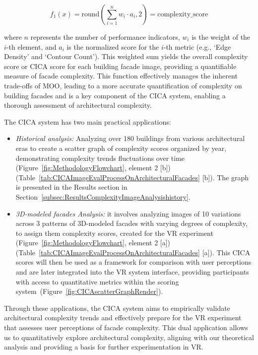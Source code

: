 \begin{equation}
    f_1(x) = \mathrm{round}\left(\sum_{i=1}^{n} w_i \cdot a_i, 2\right) = \text{complexity\_score}
    \label{eq:F1_ComplexityScoreFunction1}
\end{equation}

where \(n\) represents the number of performance indicators, \(w_i\) is the weight of the \(i\)-th element, and \(a_i\) is the normalized score for the \(i\)-th metric (e.g., `Edge Density' and `Contour Count').
This weighted sum yields the overall complexity score or CICA score for each building facade image, providing a quantifiable measure of facade complexity.
This function effectively manages the inherent trade-offs of MOO, leading to a more accurate quantification of complexity on building facades and is a key component of the CICA system, enabling a thorough assessment of architectural complexity.

The CICA system has two main practical applications:
\begin{itemize}
    \item \textit{Historical analysis:}  Analyzing over 180 buildings from various architectural eras to create a scatter graph of complexity scores organized by year, demonstrating complexity trends fluctuations over time (Figure~\ref{fig:MethodologyFlowchart}, element 2 [b]) (Table~\ref{tab:CICAImageEvalProcessOnArchitecturalFacades} [b]). The graph is presented in the Results section in Section~\ref{subsec:ResultsComplexityImageAnalysishistory}.
    \item \textit{3D-modeled facades Analysis:} it involves analyzing images of 10 variations across 3 patterns of 3D-modeled facades with varying degrees of complexity, to assign them complexity scores, created for the VR experiment  (Figure~\ref{fig:MethodologyFlowchart}, element 2 [a])  (Table~\ref{tab:CICAImageEvalProcessOnArchitecturalFacades} [a]). This CICA scores will then be used as a framework for comparison with user perceptions and are later integrated into the VR system interface, providing participants with access to quantitative metrics within the scoring system~(Figure~\ref{fig:CICAscatterGraphRender}).
\end{itemize}

Through these applications, the CICA system aims to empirically validate architectural complexity trends and effectively prepare for the VR experiment that assesses user perceptions of facade complexity.
This dual application allows us to quantitatively explore architectural complexity, aligning with our theoretical analysis and providing a basis for further experimentation in VR\@.
